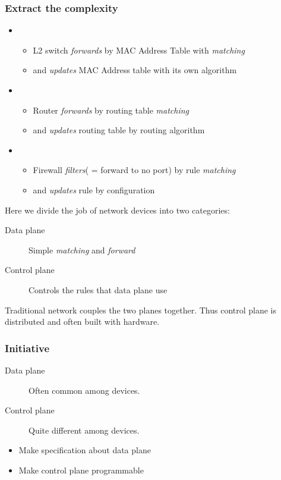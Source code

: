 \documentclass{beamer}
\begin{document}
\begin{frame}
    \frametitle{Extract the complexity}
    \begin{itemize}
        \item 
            \begin{itemize}
                \item L2 switch \emph{forwards} by MAC Address Table with \emph{matching}
                \item and \emph{updates} MAC Address table with its own algorithm
            \end{itemize}
        \item
            \begin{itemize}
                \item Router \emph{forwards} by routing table \emph{matching}
                \item and \emph{updates} routing table by routing algorithm
            \end{itemize}
        \item 
            \begin{itemize}
                \item Firewall \emph{filters}( = forward to no port) by rule \emph{matching}
                \item and \emph{updates} rule by configuration
            \end{itemize}
    \end{itemize}
    Here we divide the job of network devices into two categories:
    \begin{description}
        \item[Data plane] Simple \emph{matching} and \emph{forward}
        \item[Control plane] Controls the rules that data plane use
    \end{description}
    Traditional network couples the two planes together. Thus control plane is distributed and often built with hardware.
\end{frame}

\begin{frame}
\frametitle{Initiative}
        \begin{description}
        \item[Data plane] Often common among devices.
        \item[Control plane] Quite different among devices.
        \end{description}
        
        \begin{itemize}
            \item Make specification about data plane
            \item Make control plane programmable
        \end{itemize}
        
\end{frame}
\end{document}
